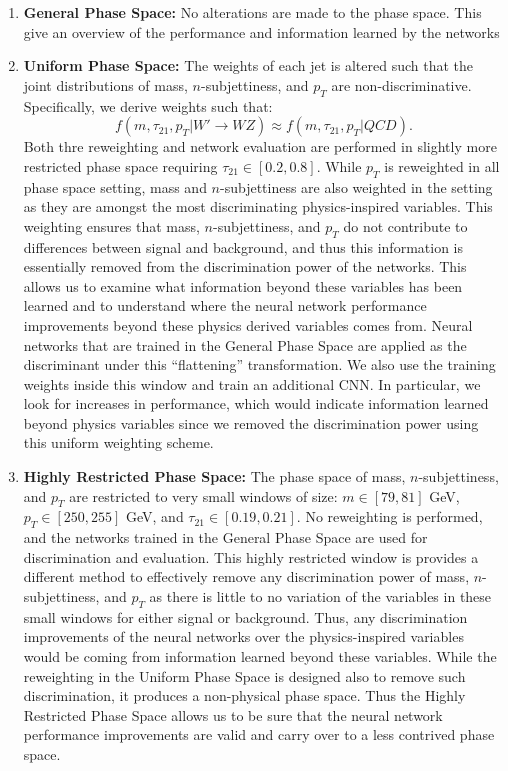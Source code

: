 \begin{enumerate}

\item \textbf{General Phase Space:} No alterations are made to the phase space.  This give an overview of the performance and information learned by the networks

\item  \textbf{Uniform Phase Space:}  The weights of each jet is altered such that the joint distributions of mass, $n$-subjettiness, and $p_T$ are non-discriminative.  Specifically, we derive weights such that:
\begin{equation}
  f(m, \tau_{21}, p_T| W'\rightarrow WZ) \approx f(m, \tau_{21}, p_T| QCD).
\end{equation}
Both thre reweighting and network evaluation are performed in slightly more restricted phase space requiring $\tau_{21}\in [0.2, 0.8]$. While $p_T$ is reweighted in all phase space setting, mass and $n$-subjettiness are also weighted in the setting as they are amongst the most discriminating physics-inspired variables.  This weighting ensures that mass, $n$-subjettiness, and $p_T$ do not contribute to differences between signal and background, and thus this information is essentially removed from the discrimination power of the networks.  This allows us to examine what information beyond these variables has been learned and to understand where the neural network performance improvements beyond these physics derived variables comes from.  Neural networks that are trained in the General Phase Space are applied as the discriminant under this ``flattening'' transformation. We also use the training weights inside this window and train an additional CNN. In particular, we look for increases in performance, which would indicate information learned beyond physics variables since we removed the discrimination power using this uniform weighting scheme.

\item \textbf{Highly Restricted Phase Space:} The phase space of mass, $n$-subjettiness, and $p_T$ are restricted to very small windows of size: $m\in [79, 81]$ GeV,  $p_T \in [250, 255]$ GeV, and  $\tau_{21} \in [0.19, 0.21]$. No reweighting is performed, and the networks trained in the General Phase Space are used for discrimination and evaluation.  This highly restricted window is provides a different method to effectively remove any discrimination power of mass, $n$-subjettiness, and $p_T$ as there is little to no variation of the variables in these small windows for either signal or background.  Thus, any discrimination improvements of the neural networks over the physics-inspired variables would be coming from information learned beyond these variables.  While the reweighting in the Uniform  Phase Space is designed also to remove such discrimination, it produces a non-physical phase space.  Thus the Highly Restricted Phase Space allows us to be sure that the neural network performance improvements are valid and carry over to a less contrived phase space.

\end{enumerate}
